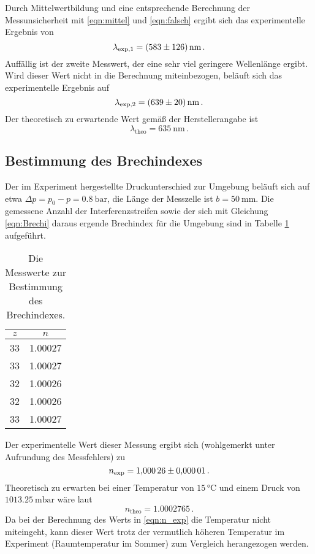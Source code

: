 Durch Mittelwertbildung und eine entsprechende Berechnung der Messunsicherheit mit \eqref{eqn:mittel} und \eqref{eqn:falsch} 
ergibt sich das experimentelle Ergebnis von 
\begin{equation}
    \lambda_\text{exp,1} = \SI{583+-126}{\nano\meter} \,. 
    \label{eqn:bloed}
\end{equation}
Auffällig ist der zweite Messwert, der eine sehr viel geringere Wellenlänge ergibt. Wird dieser Wert nicht in die Berechnung miteinbezogen, 
beläuft sich das experimentelle Ergebnis auf
\begin{equation}
    \lambda_\text{exp,2} = \SI{639+-20}{\nano\meter} \,.
    \label{eqn:besser}
\end{equation}
Der theoretisch zu erwartende Wert gemäß der Herstellerangabe ist 
\begin{equation}
    \lambda_\text{theo}=\SI{635}{\nano\meter}\,.
    \label{eqn:lam_theo}
\end{equation}

\subsection{Bestimmung des Brechindexes}

Der im Experiment hergestellte Druckunterschied zur Umgebung beläuft sich auf etwa $\Delta p=p_0-p=\SI{0.8}{\bar}$, die Länge der Messzelle ist $b=\SI{50}{\milli\meter}$. 
Die gemessene Anzahl der Interferenzstreifen sowie der sich mit Gleichung \eqref{eqn:Brechi} daraus ergende Brechindex für die Umgebung sind 
in Tabelle \ref{tab:Brech} aufgeführt. 

\begin{table}
    \centering
    \caption{Die Messwerte zur Bestimmung des Brechindexes.}
    \label{tab:Brech}
    \begin{tabular}{c c}
        \toprule
        $z$ & $n$ \\
        \midrule
        33 & 1.00027 \\
        33 & 1.00027 \\
        32 & 1.00026 \\
        32 & 1.00026 \\
        33 & 1.00027 \\
        \bottomrule
    \end{tabular}
\end{table}

Der experimentelle Wert dieser Messung ergibt sich (wohlgemerkt unter Aufrundung des Messfehlers) zu 
\begin{equation}
    n_\text{exp}=\num{1.00026+-0.00001}\,.
    \label{eqn:n_exp}
\end{equation}
Theoretisch zu erwarten bei einer Temperatur von $15\,\mathrm{°C}$ und einem Druck von $\SI{1013.25}{\milli\bar}$ 
wäre laut \cite{kohlrausch} 
\begin{equation}
    n_\text{theo}=\num{1.0002765}\,.
    \label{eqn:n_theo}
\end{equation} 
Da bei der Berechnung des Werts in \eqref{eqn:n_exp} 
die Temperatur nicht miteingeht, kann dieser Wert trotz der vermutlich höheren Temperatur im Experiment (Raumtemperatur im Sommer) zum Vergleich herangezogen werden. 